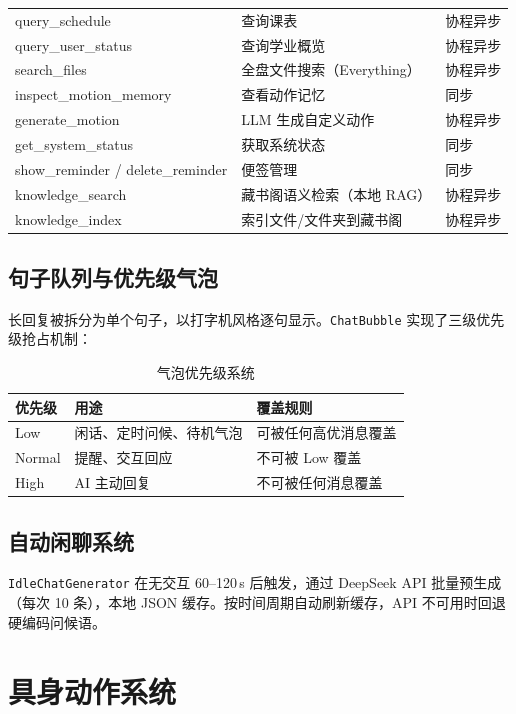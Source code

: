 \documentclass[12pt,a4paper]{ctexart}
\begin{document}
\begin{longtable}{lll}
query\_schedule & 查询课表 & 协程异步 \\
query\_user\_status & 查询学业概览 & 协程异步 \\
search\_files & 全盘文件搜索（Everything） & 协程异步 \\
inspect\_motion\_memory & 查看动作记忆 & 同步 \\
generate\_motion & LLM 生成自定义动作 & 协程异步 \\
get\_system\_status & 获取系统状态 & 同步 \\
show\_reminder / delete\_reminder & 便签管理 & 同步 \\
knowledge\_search & 藏书阁语义检索（本地 RAG） & 协程异步 \\
knowledge\_index & 索引文件/文件夹到藏书阁 & 协程异步 \\
\bottomrule
\end{longtable}

\subsection{句子队列与优先级气泡}

长回复被拆分为单个句子，以打字机风格逐句显示。\texttt{ChatBubble} 实现了三级优先级抢占机制：

\begin{table}[H]
\centering
\caption{气泡优先级系统}
\label{tab:priority}
\begin{tabular}{lll}
\toprule
\textbf{优先级} & \textbf{用途} & \textbf{覆盖规则} \\
\midrule
Low & 闲话、定时问候、待机气泡 & 可被任何高优消息覆盖 \\
Normal & 提醒、交互回应 & 不可被 Low 覆盖 \\
High & AI 主动回复 & 不可被任何消息覆盖 \\
\bottomrule
\end{tabular}
\end{table}

\subsection{自动闲聊系统}

\texttt{IdleChatGenerator} 在无交互 60--120\,s 后触发，通过 DeepSeek API 批量预生成
（每次 10 条），本地 JSON 缓存。按时间周期自动刷新缓存，API 不可用时回退硬编码问候语。

\section{具身动作系统}
\end{document}
